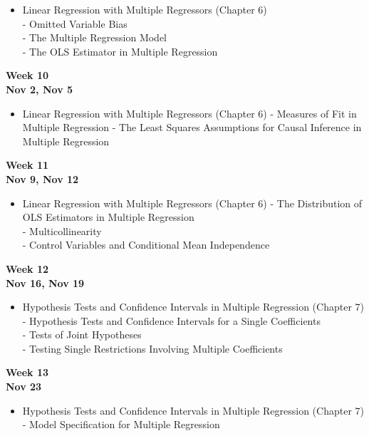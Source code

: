 \documentclass[
]{book}
\providecommand{\tightlist}{%
  \setlength{\itemsep}{0pt}\setlength{\parskip}{0pt}}
\begin{document}
\begin{itemize}
\tightlist
\item
  Linear Regression with Multiple Regressors (Chapter 6)\\
  - Omitted Variable Bias\\
  - The Multiple Regression Model\\
  - The OLS Estimator in Multiple Regression
\end{itemize}

\textbf{Week 10}\\
\textbf{Nov 2, Nov 5}

\begin{itemize}
\tightlist
\item
  Linear Regression with Multiple Regressors (Chapter 6)
  - Measures of Fit in Multiple Regression
  - The Least Squares Assumptions for Causal Inference in Multiple Regression
\end{itemize}

\textbf{Week 11}\\
\textbf{Nov 9, Nov 12}

\begin{itemize}
\tightlist
\item
  Linear Regression with Multiple Regressors (Chapter 6)
  - The Distribution of OLS Estimators in Multiple Regression\\
  - Multicollinearity\\
  - Control Variables and Conditional Mean Independence
\end{itemize}

\textbf{Week 12}\\
\textbf{Nov 16, Nov 19}

\begin{itemize}
\tightlist
\item
  Hypothesis Tests and Confidence Intervals in Multiple Regression (Chapter 7)\\
  - Hypothesis Tests and Confidence Intervals for a Single Coefficients\\
  - Tests of Joint Hypotheses\\
  - Testing Single Restrictions Involving Multiple Coefficients
\end{itemize}

\textbf{Week 13}\\
\textbf{Nov 23}

\begin{itemize}
\tightlist
\item
  Hypothesis Tests and Confidence Intervals in Multiple Regression (Chapter 7)\\
  - Model Specification for Multiple Regression
\end{itemize}
\end{document}
